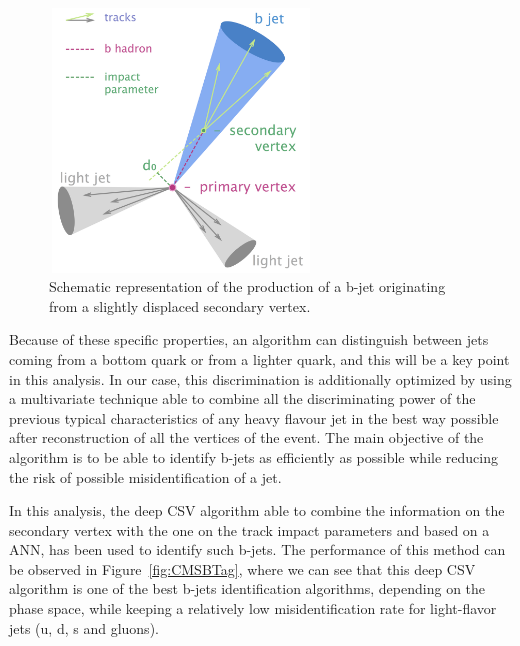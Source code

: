 \documentclass[a4paper, 10pt, openright]{report}
\begin{document}
\begin{figure}[htbp]
\begin{center}
\includegraphics[width=7cm, height=7cm]{figs/CMSBJets.png}
\caption{Schematic representation of the production of a b-jet originating from a slightly displaced secondary vertex.}
\label{fig:CMSBJets}
\end{center}
\end{figure}

Because of these specific properties, an algorithm can distinguish between jets coming from a bottom quark or from a lighter quark, and this will be a key point in this analysis. In our case, this discrimination is additionally optimized by using a multivariate technique able to combine all the discriminating power of the previous typical characteristics of any heavy flavour jet in the best way possible after reconstruction of all the vertices of the event. The main objective of the algorithm is to be able to identify b-jets as efficiently as possible while reducing the risk of possible misidentification of a jet. 

In this analysis, the deep \ac{CSV} algorithm able to combine the information on the secondary vertex with the one on the track impact parameters and based on a \ac{ANN}, has been used to identify such b-jets. The performance of this method can be observed in Figure~\ref{fig:CMSBTag}, where we can see that this deep \ac{CSV} algorithm is one of the best b-jets identification algorithms, depending on the phase space, while keeping a relatively low misidentification rate for light-flavor jets (u, d, s and gluons).
\end{document}
